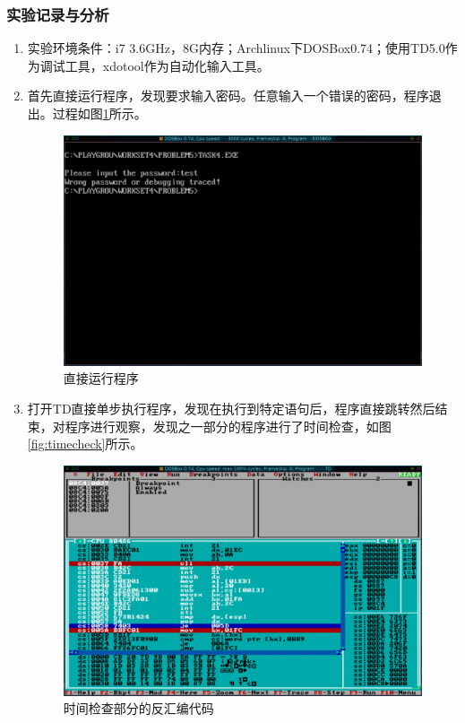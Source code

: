 \documentclass{article}
\begin{document}
	\subsubsection{实验记录与分析}
	\begin{enumerate}
		\item 实验环境条件：i7 3.6GHz，8G内存；Archlinux下DOSBox0.74；使用TD5.0作为调试工具，xdotool作为自动化输入工具。
		\item 首先直接运行程序，发现要求输入密码。任意输入一个错误的密码，程序退出。过程如图\ref{fig:wrongpass}所示。
			\begin{figure}[H]
				\centering
				\includegraphics[width=0.85\linewidth]{res/homework_4/wrongpass.png}
				\caption{直接运行程序}
				\label{fig:wrongpass}
			\end{figure}
		\item 打开TD直接单步执行程序，发现在执行到特定语句后，程序直接跳转然后结束，对程序进行观察，发现之一部分的程序进行了时间检查，如图\ref{fig:timecheck}所示。
			\begin{figure}[H]
				\centering
				\includegraphics[width=0.85\linewidth]{res/homework_4/timecheck.png}
				\caption{时间检查部分的反汇编代码}

\end{figure}
\end{enumerate}
\end{document}
